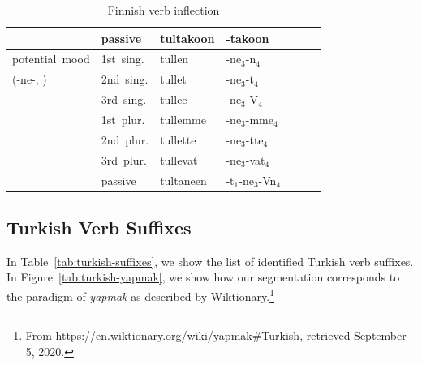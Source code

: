 \documentclass[11pt,letterpaper]{article}
\begin{document}
\begin{table}
\begin{tabular}{l|llllll}
	&	passive 	&tultakoon  & -takoon\\ \hline
	potential mood 	 &	1st sing. &	tullen  & -ne$_3$-n$_4$\\ 
		(-ne-, \cite[Section 67]{karlsson1999finnish}) & 2nd sing. &	tullet  & -ne$_3$-t$_4$\\ 
	&	3rd sing. &	tullee  & -ne$_3$-V$_4$\\ 
	&	1st plur. &	tullemme  & -ne$_3$-mme$_4$\\ 
	&	2nd plur. &	tullette  & -ne$_3$-tte$_4$\\ 
	&	3rd plur. &	tullevat  & -ne$_3$-vat$_4$\\ 
	&	passive &	tultaneen  & -t$_1$-ne$_3$-Vn$_4$ \\ \hline
\end{tabular}
	\caption{Finnish verb inflection}\label{tab:finnish}
\end{table}

\subsection{Turkish Verb Suffixes}

In Table~\ref{tab:turkish-suffixes}, we show the list of identified Turkish verb suffixes.
In Figure~\ref{tab:turkish-yapmak}, we show how our segmentation corresponds to the paradigm of \textit{yapmak} as described by Wiktionary.\footnote{From https://en.wiktionary.org/wiki/yapmak\#Turkish, retrieved September 5, 2020.}
\end{document}
